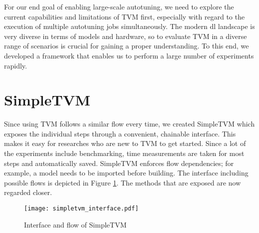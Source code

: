 For our end goal of enabling large-scale autotuning, we need to explore the current capabilities and limitations of TVM first, especially with regard to the execution of multiple autotuning jobs simultaneously. The modern \gls{dl} landscape is very diverse in terms of models and hardware, so to evaluate TVM in a diverse range of scenarios is crucial for gaining a proper understanding. To this end, we developed a framework that enables us to perform a large number of experiments rapidly.

\section{SimpleTVM}
Since using TVM follows a similar flow every time, we created SimpleTVM which exposes the individual steps through a convenient, chainable interface. This makes it easy for researches who are new to TVM to get started. Since a lot of the experiments include benchmarking, time measurements are taken for most steps and automatically saved. SimpleTVM enforces flow dependencies; for example, a model needs to be imported before building. The interface including possible flows is depicted in Figure \ref{fig:simpletvm-interface}. The methods that are exposed are now regarded closer.

\begin{figure}
	\centering
	\texttt{[image: simpletvm\_interface.pdf]}%
	\caption{Interface and flow of SimpleTVM}
	\label{fig:simpletvm-interface}
\end{figure}

